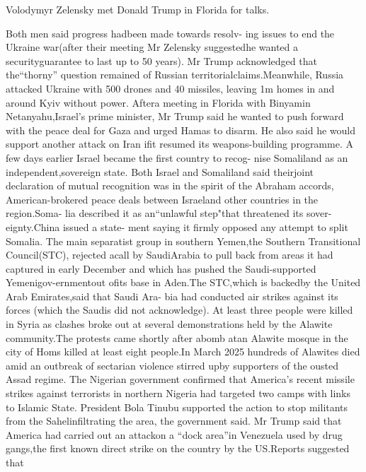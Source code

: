 \documentclass[a4paper,twoside]{ctexart}
\begin{document}
Volodymyr Zelensky  met Donald Trump in Florida for talks.

Both men said progress hadbeen made towards resolv- ing issues to end the Ukraine war(after their meeting Mr
Zelensky suggestedhe wanted a securityguarantee to last up  to 50 years).
Mr Trump acknowledged that the“thorny” question remained of Russian  territorialclaims.Meanwhile, Russia attacked Ukraine with  500 drones and 40 missiles,
leaving 1m homes in and around Kyiv without power.
Aftera meeting in Florida with Binyamin  Netanyahu,Israel's  prime minister,
Mr Trump said he wanted to push forward with the peace deal for Gaza and urged Hamas to disarm.
He also said he would support another attack on Iran ifit resumed its weapons-building programme.
A few days earlier Israel became the first country to recog- nise Somaliland as an independent,sovereign  state. Both Israel and Somaliland
said theirjoint declaration of   mutual recognition was in the spirit of the Abraham accords, American-brokered peace
deals between Israeland other countries in the region.Soma-  lia described it as an“unlawful step"that threatened its sover- eignty.China issued a state-
ment saying it firmly opposed any attempt to split Somalia.
The main separatist group in southern Yemen,the  Southern Transitional Council(STC),
rejected acall by SaudiArabia to pull back from areas it had    captured in early December
and which has pushed the Saudi-supported Yemenigov-ernmentout ofits base in
Aden.The STC,which is backedby the United Arab Emirates,said that Saudi Ara- bia had conducted air strikes  against its forces
(which the Saudis did not acknowledge).
At least three people were killed in Syria as clashes broke out at several demonstrations held by the Alawite community.The protests came shortly 
after abomb atan Alawite mosque in the city of Homs
killed at least eight people.In March 2025 hundreds of Alawites died amid an outbreak of sectarian violence
stirred upby supporters of the ousted Assad regime.
The Nigerian government confirmed that America's recent missile strikes against terrorists in northern Nigeria had targeted two camps with links to Islamic State.
President Bola Tinubu supported the action to stop militants from   the Sahelinfiltrating the area, the government said.
Mr Trump said that America
had carried out an attackon a “dock area”in Venezuela used by drug gangs,the first known  direct strike on the country by  the US.Reports suggested that
\end{document}
